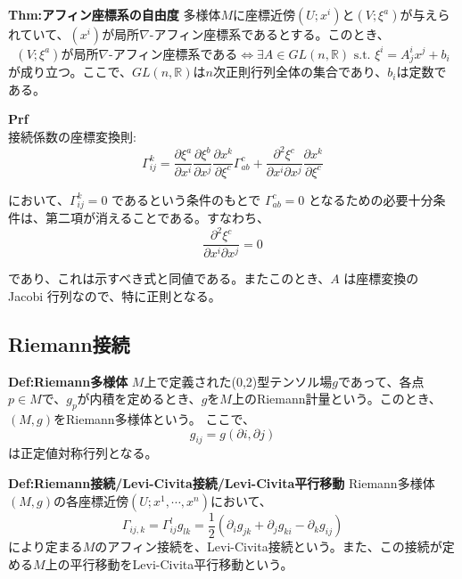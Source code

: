 \documentclass[a4paper,11pt]{jsarticle}
\numberwithin{equation}{section}
\begin{document}
\begin{itembox}[l]{\textbf{Thm:アフィン座標系の自由度}}
    多様体$M$に座標近傍$(U;x^i)$と$(V;\xi^a)$が与えられていて、$(x^i)$が局所$\nabla$-アフィン座標系であるとする。このとき、
    \begin{equation}
        (V;\xi^a)\text{が局所$\nabla$-アフィン座標系である} \Leftrightarrow \exists A \in GL(n,\mathbb{R}) \text{ s.t. } \xi^i = A^i_jx^j + b_i
    \end{equation}
    が成り立つ。ここで、$GL(n,\mathbb{R})$は$n$次正則行列全体の集合であり、$b_i$は定数である。
\end{itembox}
\textbf{Prf}\\
接続係数の座標変換則:
\begin{equation}
    \Gamma^k_{ij} = \frac{\partial \xi^a}{\partial x^i} \frac{\partial \xi^b}{\partial x^j} \frac{\partial x^k}{\partial \xi^c} \Gamma^c_{ab} + \frac{\partial^2 \xi^c}{\partial x^i \partial x^j} \frac{\partial x^k}{\partial \xi^c}
\end{equation}

において、\(\Gamma^k_{ij} = 0\) であるという条件のもとで \(\Gamma^c_{ab} = 0\) となるための必要十分条件は、第二項が消えることである。すなわち、
\begin{equation}
    \frac{\partial^2 \xi^c}{\partial x^i \partial x^j} = 0
\end{equation}

であり、これは示すべき式と同値である。またこのとき、\(A\) は座標変換の Jacobi 行列なので、特に正則となる。\hfill\qedsymbol

\subsection{Riemann接続}
\begin{itembox}[l]{\textbf{Def:Riemann多様体}}
    $M$上で定義された(0,2)型テンソル場$g$であって、各点$p \in M$で、$g_p$が内積を定めるとき、$g$を$M$上のRiemann計量という。このとき、$(M,g)$をRiemann多様体という。
    ここで、
    \begin{equation}
        g_{ij} = g(\partial{i},\partial{j})
    \end{equation}
    は正定値対称行列となる。
\end{itembox}


\begin{itembox}[l]{\textbf{Def:Riemann接続/Levi-Civita接続/Levi-Civita平行移動}}
    Riemann多様体$(M,g)$の各座標近傍$(U;x^1,\cdots,x^n)$において、
    \begin{equation}
        \Gamma_{ij,k} = \Gamma_{ij}^l g_{lk}=\frac{1}{2}(\partial_i g_{jk} + \partial_j g_{ki} - \partial_k g_{ij})
    \end{equation}
    により定まる$M$のアフィン接続を、Levi-Civita接続という。また、この接続が定める$M$上の平行移動をLevi-Civita平行移動という。  

\end{itembox}
\end{document}
